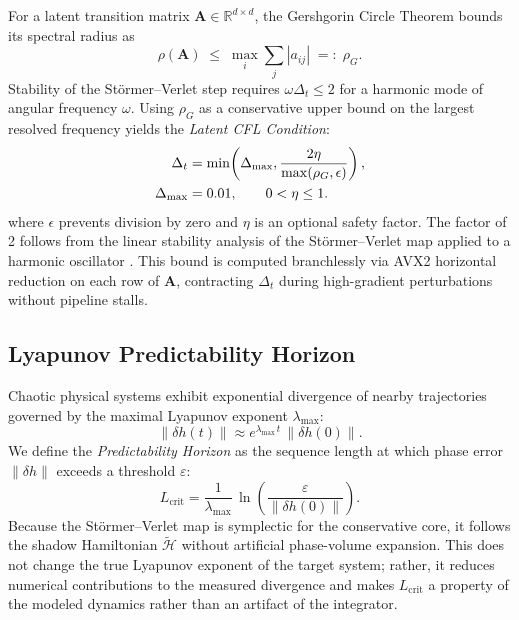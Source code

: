 \documentclass[10pt,twocolumn]{article}
\newcommand{\R}{\mathbb{R}}
\newcommand{\calH}{\mathcal{H}}
\begin{document}
For a latent transition matrix $\mathbf{A}\in\R^{d\times d}$,
the Gershgorin Circle Theorem bounds its spectral radius as
\begin{equation}
  \rho(\mathbf{A}) \;\le\; \max_i \sum_j |a_{ij}| \;=:\; \rho_G.
  \label{eq:gerschgorin}
\end{equation}
Stability of the St\"{o}rmer--Verlet step requires
$\omega\Delta_t \le 2$ for a harmonic mode of angular frequency $\omega$.
Using $\rho_G$ as a conservative upper bound on the largest resolved
frequency yields the
\textit{Latent CFL Condition}:
\begin{align}
  \Delta_t
  &= \min\!\left(\Delta_{\max},
        \frac{2\eta}{\max(\rho_G,\epsilon)}\right),
        \label{eq:cfl}\\
  \Delta_{\max}&=0.01,\qquad 0<\eta\le 1. \notag
\end{align}
where $\epsilon$ prevents division by zero and $\eta$ is an optional safety
factor. The factor of 2 follows from the linear stability analysis of the
St\"{o}rmer--Verlet map applied to a harmonic oscillator
\cite{hairer2006geometric}. This bound is computed branchlessly via AVX2
horizontal reduction on each row of $\mathbf{A}$, contracting $\Delta_t$
during high-gradient perturbations without pipeline stalls.
\subsection{Lyapunov Predictability Horizon}
\label{sec:lyapunov}

Chaotic physical systems exhibit exponential divergence of nearby
trajectories governed by the maximal Lyapunov exponent $\lambda_{\max}$:
\begin{equation}
  \|\delta h(t)\| \approx e^{\lambda_{\max}\,t}\,\|\delta h(0)\|.
\end{equation}
We define the \textit{Predictability Horizon} as the sequence length
at which phase error $\|\delta h\|$ exceeds a threshold $\varepsilon$:
\begin{equation}
  L_{\text{crit}} = \frac{1}{\lambda_{\max}}\,
    \ln\!\left(\frac{\varepsilon}{\|\delta h(0)\|}\right).
  \label{eq:lcrit}
\end{equation}
Because the St\"{o}rmer--Verlet map is symplectic for the conservative core,
it follows the shadow Hamiltonian $\tilde{\calH}$ without artificial
phase-volume expansion. This does not change the true Lyapunov exponent of
the target system; rather, it reduces numerical contributions to the measured
divergence and makes $L_{\text{crit}}$ a property of the modeled dynamics
rather than an artifact of the integrator.
\end{document}
